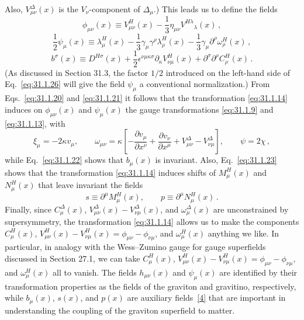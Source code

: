 Also, \(V_{\mu\nu}^\Delta(x)\) is the \(V_\nu\)-component of
\(\Delta_\mu\).) This leads us to define the fields
\begin{equation}
  \phi_{\mu\nu}(x)
  \equiv V_{\mu\nu}^H(x)
  -\frac13\eta_{\mu\nu}V^{H\lambda}{}_\lambda(x)\,,
  \tag{31.1.25}\label{eq:31.1.25}
\end{equation}
\begin{equation}
  \frac12\psi_\mu(x)
  \equiv\lambda_\mu^H(x)
  -\frac13\gamma_\mu\gamma^\rho\lambda_\rho^H(x)
  -\frac13\gamma_\mu\partial^\rho\omega_\rho^H(x)\,,
  \tag{31.1.26}\label{eq:31.1.26}
\end{equation}
\begin{equation}
  b^\sigma(x)
  \equiv D^{H\sigma}(x)
  +\frac12\epsilon^{\nu\mu\kappa\sigma}
    \partial_\kappa V_{\nu\mu}^H(x)
  +\partial^\sigma\partial^\rho C_\rho^H(x)\,.
  \tag{31.1.27}\label{eq:31.1.27}
\end{equation}
(As discussed in Section 31.3, the factor \(1/2\) introduced on the left-hand
side of Eq.~\eqref{eq:31.1.26} will give the field \(\psi_\mu\) a
conventional normalization.) From Eqs.~\eqref{eq:31.1.20} and
\eqref{eq:31.1.21} it follows that the transformation \eqref{eq:31.1.14}
induces on \(\phi_{\mu\nu}(x)\) and \(\psi_\mu(x)\) the gauge transformations
\eqref{eq:31.1.9} and \eqref{eq:31.1.13}, with
\begin{equation}
  \xi_\mu=-2\kappa v_\mu,\qquad
  \omega_{\mu\nu}
  =\kappa\left[
    -\frac{\partial v_\mu}{\partial x^\nu}
    +\frac{\partial v_\nu}{\partial x^\mu}
    +V_{\mu\nu}^\Delta-V_{\nu\mu}^\Delta
  \right],\qquad
  \psi=2\chi\,,
  \tag{31.1.28}\label{eq:31.1.28}
\end{equation}
while Eq.~\eqref{eq:31.1.22} shows that \(b_\mu(x)\) is invariant. Also,
Eq.~\eqref{eq:31.1.23} shows that the transformation \eqref{eq:31.1.14}
induces shifts of \(M_\mu^H(x)\) and \(N_\mu^H(x)\) that leave invariant the
fields
\begin{equation}
  s\equiv\partial^\mu M_\mu^H(x),\qquad
  p\equiv\partial^\mu N_\mu^H(x)\,.
  \tag{31.1.29}\label{eq:31.1.29}
\end{equation}
Finally, since \(C_\mu^\Delta(x)\),
\(V_{\mu\nu}^\Delta(x)-V_{\nu\mu}^\Delta(x)\), and
\(\omega_\mu^\Delta(x)\) are unconstrained by supersymmetry, the
transformation \eqref{eq:31.1.14} allows us to make the components
\(C_\mu^H(x)\),
\(V_{\mu\nu}^H(x)-V_{\nu\mu}^H(x)=\phi_{\mu\nu}-\phi_{\nu\mu}\), and
\(\omega_\mu^H(x)\) anything we like. In particular, in analogy with the
Wess--Zumino gauge for gauge superfields discussed in Section 27.1, we can
take \(C_\mu^H(x)\),
\(V_{\mu\nu}^H(x)-V_{\nu\mu}^H(x)=\phi_{\mu\nu}-\phi_{\nu\mu}\), and
\(\omega_\mu^H(x)\) all to vanish. The fields \(h_{\mu\nu}(x)\) and
\(\psi_\mu(x)\) are identified by their transformation properties as the
fields of the graviton and gravitino, respectively, while \(b_\mu(x)\),
\(s(x)\), and \(p(x)\) are auxiliary
fields~\hyperref[ch31-ref-4]{[4]} that are important in understanding the
coupling of the graviton superfield to matter.

